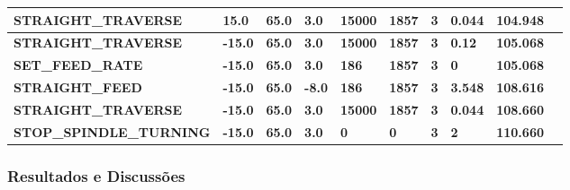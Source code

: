 \documentclass[aspectratio=169]{beamer}
\begin{document}
{\begin{frame}[fragile]
\begin{tabular}{|l|l|l|l|l|l|l|l|l|l|}
      \tiny{\bfseries{STRAIGHT\_TRAVERSE}} & 
      \tiny{\bfseries{15.0}} & 
      \tiny{\bfseries{65.0}} & 
      \tiny{\bfseries{3.0}} & 
      \tiny{\bfseries{15000}} & 
      \tiny{\bfseries{1857}} & 
      \tiny{\bfseries{3}} & 
      \tiny{\bfseries{0.044}} & 
      \tiny{\bfseries{104.948}} \\
      \hline

      \tiny{\bfseries{STRAIGHT\_TRAVERSE}} & 
      \tiny{\bfseries{-15.0}} & 
      \tiny{\bfseries{65.0}} & 
      \tiny{\bfseries{3.0}} & 
      \tiny{\bfseries{15000}} & 
      \tiny{\bfseries{1857}} & 
      \tiny{\bfseries{3}} & 
      \tiny{\bfseries{0.12}} & 
      \tiny{\bfseries{105.068}} \\
      \hline

      \tiny{\bfseries{SET\_FEED\_RATE}} & 
      \tiny{\bfseries{-15.0}} & 
      \tiny{\bfseries{65.0}} & 
      \tiny{\bfseries{3.0}} & 
      \tiny{\bfseries{186}} & 
      \tiny{\bfseries{1857}} & 
      \tiny{\bfseries{3}} & 
      \tiny{\bfseries{0}} & 
      \tiny{\bfseries{105.068}} \\
      \hline

      \tiny{\bfseries{STRAIGHT\_FEED}} & 
      \tiny{\bfseries{-15.0}} & 
      \tiny{\bfseries{65.0}} & 
      \tiny{\bfseries{-8.0}} & 
      \tiny{\bfseries{186}} & 
      \tiny{\bfseries{1857}} & 
      \tiny{\bfseries{3}} & 
      \tiny{\bfseries{3.548}} & 
      \tiny{\bfseries{108.616}} \\
      \hline

      \tiny{\bfseries{STRAIGHT\_TRAVERSE}} & 
      \tiny{\bfseries{-15.0}} & 
      \tiny{\bfseries{65.0}} & 
      \tiny{\bfseries{3.0}} & 
      \tiny{\bfseries{15000}} & 
      \tiny{\bfseries{1857}} & 
      \tiny{\bfseries{3}} & 
      \tiny{\bfseries{0.044}} & 
      \tiny{\bfseries{108.660}} \\
      \hline

      \tiny{\bfseries{STOP\_SPINDLE\_TURNING}} & 
      \tiny{\bfseries{-15.0}} & 
      \tiny{\bfseries{65.0}} & 
      \tiny{\bfseries{3.0}} & 
      \tiny{\bfseries{0}} & 
      \tiny{\bfseries{0}} & 
      \tiny{\bfseries{3}} & 
      \tiny{\bfseries{2}} & 
      \tiny{\bfseries{110.660}} \\
      \hline

  \end{tabular}

\end{frame}


\begin{frame}[fragile]
  \frametitle{Resultados e Discussões}


\end{frame}}
\end{document}
